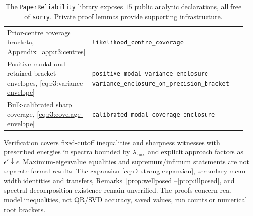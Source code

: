 \begin{table}[!htbp]
\begin{tabular}{@{}>{\raggedright\arraybackslash}p{0.31\linewidth}p{0.66\linewidth}@{}}
Prior-centre coverage brackets, Appendix~\ref{app:r3:centres} &
  \mbox{\texttt{likelihood\_centre\_coverage}}\\
Positive-modal and retained-bracket envelopes, \eqref{eq:r3:variance-envelope} &
  \mbox{\texttt{positive\_modal\_variance\_enclosure}}\newline
  \mbox{\texttt{variance\_enclosure\_on\_precision\_bracket}}\\
Bulk-calibrated sharp coverage, \eqref{eq:r3:coverage-envelope} &
  \mbox{\texttt{calibrated\_modal\_coverage\_enclosure}}\\
\bottomrule
\end{tabular}
\caption{The \texttt{PaperReliability} library exposes $15$ public analytic
declarations, all free of \texttt{sorry}. Private proof lemmas provide
supporting infrastructure.}
\label{tab:lean}
\end{table}

Verification covers fixed-cutoff inequalities and sharpness witnesses with
prescribed energies in spectra bounded by $\lambda_{\max}$ and explicit approach
factors as $\epsilon'\downarrow\epsilon$. Maximum-eigenvalue equalities and
supremum/infimum statements are not separate formal results.
The expansion \eqref{eq:r3-strong-expansion}, secondary mean-width identities and
transfers, Remarks~\ref{prop:wellposed}--\ref{prop:illposed}, and spectral-decomposition
existence remain unverified. The proofs concern real-model inequalities, not
QR/SVD accuracy, saved values, run counts or numerical root brackets.

